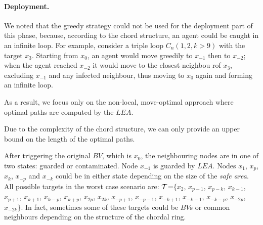 %

\paragraph{\bf Deployment.}



We noted that the greedy strategy could not be used for the deployment part of this phase, because, according to the chord structure, an agent could be caught  in an infinite loop. For example,  consider  a triple loop $C_n(1,2,k>9)$ with the target  $x_{3}$. Starting from $x_{0}$, an agent would move greedily to $x_{-1}$ then to $x_{-2}$; when the agent reached $x_{-2}$  it would move to the closest neighbou rof  $x_{3}$, excluding $x_{-1}$ and any infected neighbour, thus moving to $x_{0}$ again and forming an infinite loop. 


As a result, we focus only on the non-local, move-optimal approach where optimal paths are computed by the $LEA$.

Due to the complexity of the chord structure, we can only provide an upper bound on the length of the optimal paths.
 
After triggering the original $BV$, which is $x_{0}$,  the neighbouring nodes are in one of two states: guarded or contaminated.
Node $x_{-1}$ is  guarded by $LEA$. Nodes $x_{1}$, $x_{p}$, $x_{k}$, $x_{-p}$ and $x_{-k}$ could be in either state depending on the size of the {\it safe area}.
All possible targets in the worst case scenario are: ${\cal T}$=$\{x_{2}$, $x_{p-1}$, $x_{p-k}$, $x_{k-1}$, $x_{p+1}$, $x_{k+1}$, $x_{k-p}$, $x_{k+p}$, $x_{2p}$, $x_{2k}$, $x_{-p+1}$, $x_{-p-1}$, $x_{-k+1}$, $x_{-k-1}$, $x_{-k-p}$, $x_{-2p}$, $x_{-2k}\}$. In fact, sometimes some of these targets could be $BV$s or common neighbours depending on the structure of the chordal ring. 



